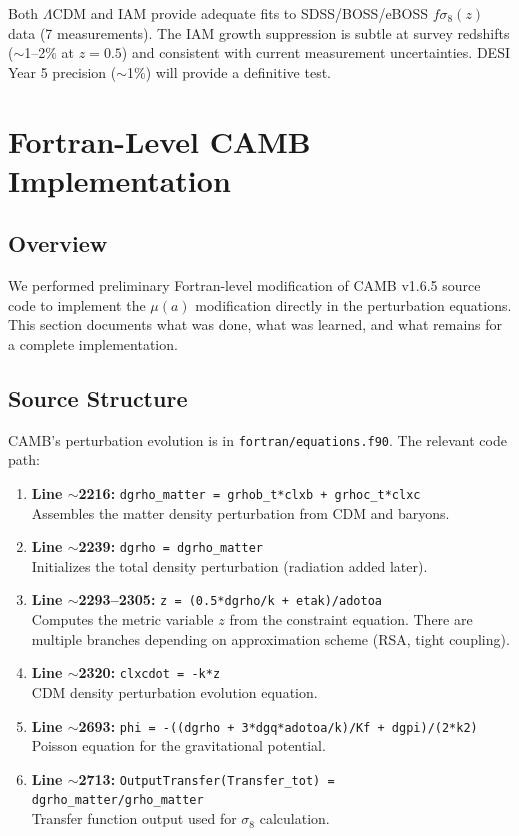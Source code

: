 \documentclass[11pt,letterpaper]{article}
\begin{document}
Both $\Lambda$CDM and IAM provide adequate fits to SDSS/BOSS/eBOSS $f\sigma_8(z)$ data (7 measurements). The IAM growth suppression is subtle at survey redshifts ($\sim$1--2\% at $z = 0.5$) and consistent with current measurement uncertainties. DESI Year 5 precision ($\sim$1\%) will provide a definitive test.

\section{Fortran-Level CAMB Implementation}
\label{sec:fortran}

\subsection{Overview}

We performed preliminary Fortran-level modification of CAMB v1.6.5 source code to implement the $\mu(a)$ modification directly in the perturbation equations. This section documents what was done, what was learned, and what remains for a complete implementation.

\subsection{Source Structure}

CAMB's perturbation evolution is in \texttt{fortran/equations.f90}. The relevant code path:

\begin{enumerate}
\item \textbf{Line $\sim$2216:} \texttt{dgrho\_matter = grhob\_t*clxb + grhoc\_t*clxc} \\
Assembles the matter density perturbation from CDM and baryons.

\item \textbf{Line $\sim$2239:} \texttt{dgrho = dgrho\_matter} \\
Initializes the total density perturbation (radiation added later).

\item \textbf{Line $\sim$2293--2305:} \texttt{z = (0.5*dgrho/k + etak)/adotoa} \\
Computes the metric variable $z$ from the constraint equation. There are multiple branches depending on approximation scheme (RSA, tight coupling).

\item \textbf{Line $\sim$2320:} \texttt{clxcdot = -k*z} \\
CDM density perturbation evolution equation.

\item \textbf{Line $\sim$2693:} \texttt{phi = -((dgrho + 3*dgq*adotoa/k)/Kf + dgpi)/(2*k2)} \\
Poisson equation for the gravitational potential.

\item \textbf{Line $\sim$2713:} \texttt{OutputTransfer(Transfer\_tot) = dgrho\_matter/grho\_matter} \\
Transfer function output used for $\sigma_8$ calculation.
\end{enumerate}
\end{document}
